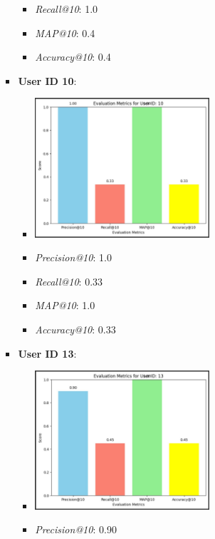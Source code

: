 \documentclass[journal,article,submit,pdftex,moreauthors]{Definitions/mdpi}
\begin{document}
\begin{enumerate}
\begin{itemize}
\begin{itemize}
\begin{itemize}
                \item \textit{Recall@10}: 1.0
                \item \textit{MAP@10}: 0.4
                \item \textit{Accuracy@10}: 0.4
            \end{itemize}
            \item \textbf{User ID 10}:
            \begin{itemize}
                \item \includegraphics[width=0.6\textwidth]{images/metric3.jpeg}
                \item \textit{Precision@10}: 1.0
                \item \textit{Recall@10}: 0.33
                \item \textit{MAP@10}: 1.0
                \item \textit{Accuracy@10}: 0.33
            \end{itemize}
            \item \textbf{User ID 13}:
            \begin{itemize}
                \item \includegraphics[width=0.6\textwidth]{images/metric4.jpeg}
                \item \textit{Precision@10}: 0.90

\end{itemize}
\end{itemize}
\end{itemize}
\end{enumerate}
\end{document}
